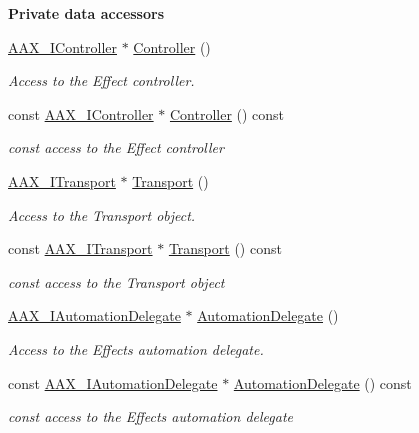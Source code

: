 \begin{Indent}\textbf{ Private data accessors}\par
\begin{DoxyCompactItemize}
\item 
\mbox{\hyperlink{a01789}{A\+A\+X\+\_\+\+I\+Controller}} $\ast$ \mbox{\hyperlink{a01481_a2aad1f84d38b40fee029629c53273a56}{Controller}} ()
\begin{DoxyCompactList}\small\item\em Access to the Effect controller. \end{DoxyCompactList}\item 
const \mbox{\hyperlink{a01789}{A\+A\+X\+\_\+\+I\+Controller}} $\ast$ \mbox{\hyperlink{a01481_a36cda1bd12573e6ddd21fdd90b460ece}{Controller}} () const
\begin{DoxyCompactList}\small\item\em {\ttfamily const} access to the Effect controller \end{DoxyCompactList}\item 
\mbox{\hyperlink{a01885}{A\+A\+X\+\_\+\+I\+Transport}} $\ast$ \mbox{\hyperlink{a01481_af003e341f47eb1f170529db63066eca3}{Transport}} ()
\begin{DoxyCompactList}\small\item\em Access to the Transport object. \end{DoxyCompactList}\item 
const \mbox{\hyperlink{a01885}{A\+A\+X\+\_\+\+I\+Transport}} $\ast$ \mbox{\hyperlink{a01481_abd1c96049bff78dd21994824bdff0f03}{Transport}} () const
\begin{DoxyCompactList}\small\item\em {\ttfamily const} access to the Transport object \end{DoxyCompactList}\item 
\mbox{\hyperlink{a01773}{A\+A\+X\+\_\+\+I\+Automation\+Delegate}} $\ast$ \mbox{\hyperlink{a01481_ab88816d6dd3a86ae3db189e3b0d662b8}{Automation\+Delegate}} ()
\begin{DoxyCompactList}\small\item\em Access to the Effect\textquotesingle{}s automation delegate. \end{DoxyCompactList}\item 
const \mbox{\hyperlink{a01773}{A\+A\+X\+\_\+\+I\+Automation\+Delegate}} $\ast$ \mbox{\hyperlink{a01481_a572dc5683af7f848cefb876ac96b499d}{Automation\+Delegate}} () const
\begin{DoxyCompactList}\small\item\em {\ttfamily const} access to the Effect\textquotesingle{}s automation delegate \end{DoxyCompactList}\end{DoxyCompactItemize}
\end{Indent}
